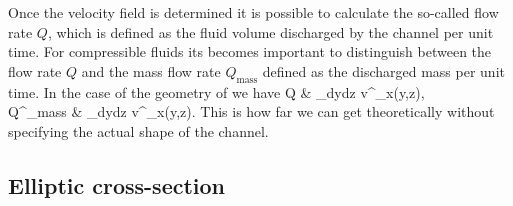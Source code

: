 Once the velocity field is determined it is possible to calculate
the so-called flow rate $Q$, which is defined as the fluid volume
discharged by the channel per unit time. For compressible fluids
its becomes important to distinguish between the flow rate $Q$ and
the mass flow rate $Q^{{}}_\textrm{mass}$ defined as the
discharged mass per unit time. In the case of the geometry of
 we have
%
 \bsubal
 Q & \equiv \int_dy\:dz\:
 v^{{}}_x(y,z),\\[2mm]
 Q^{{}}_\textrm{mass} & \equiv \int_dy\:dz\:
 \rho\: v^{{}}_x(y,z).
 \esubal
%
This is how far we can get theoretically without specifying the
actual shape of the channel.


\subsection{Elliptic cross-section}

